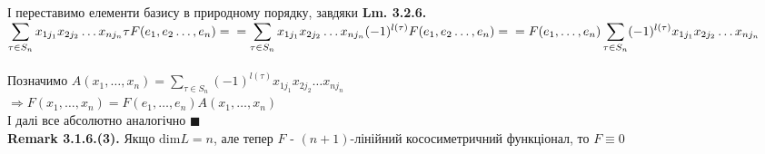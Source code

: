 \documentclass[a4paper, 14pt]{extarticle}
\def\huge{\displaystyle}
\def\rm#1{\textbf{Remark {#1}}}
\def\bigline{\vspace{5mm}\\}
\def\qed{$\blacksquare$}
\def\dim#1{\textrm{dim} {#1}}
\begin{document}
І переставимо елементи базису в природному порядку, завдяки \textbf{Lm. 3.2.6.} \\
$\huge \sum_{\tau \in S_n} x_{1j_1}x_{2j_2}\dots x_{n j_n} \tau F(e_1,e_2\dots, e_n) = \\
= \huge \sum_{\tau \in S_n} x_{1j_1}x_{2j_2}\dots x_{n j_n} (-1)^{l(\tau)} F(e_1,e_2\dots, e_n) = \\
= \huge F(e_1,\dots,e_n) \sum_{\tau \in S_n} (-1)^{l(\tau)} x_{1j_1}x_{2j_2}\dots x_{n j_n}$\\
\\
Позначимо $A(x_1,\dots,x_n) = \huge \sum_{\tau \in S_n} (-1)^{l(\tau)} x_{1j_1}x_{2j_2}\dots x_{n j_n}$\\
$\Rightarrow F(x_1,\dots,x_n) = F(e_1,\dots,e_n)A(x_1,\dots,x_n)$\\
І далі все абсолютно аналогічно \qed
\bigline
\rm{3.1.6.(3).} Якщо $\dim L = n$, але тепер $F$ - $(n+1)$-лінійний кососиметричний функціонал, то $F \equiv 0$
\bigline
\end{document}
